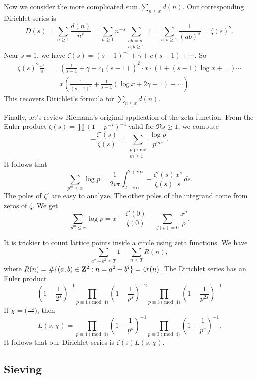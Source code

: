 Now we consider the more complicated sum $\sum_{n\leqslant x} d(n)$. Our 
corresponding Dirichlet series is 
\[
  D(s) = \sum_{n\geqslant 1} \frac{d(n)}{n^s} = \sum_{n\geqslant 1} n^{-s} \sum_{\substack{a b=n \\ a,b\geqslant 1}} 1 = \sum_{a,b\geqslant 1}\frac{1}{(a b)^s} = \zeta(s)^2 .
\]
Near $s=1$, we have $\zeta(s)=(s-1)^{-1} + \gamma + c(s-1) + \cdots$. So 
\begin{align*}
  \zeta(s)^2 \frac{x^s}{s} 
    &= \left(\frac{1}{s-1} + \gamma+ c_1(s-1)\right)^2 \cdot x \cdot \left(1+(s-1)\log x + \ldots\right)\cdots \\
    &= x\left(\frac{1}{(s-1)^2} + \frac{1}{s-1}(\log x+2\gamma-1) + \cdots\right) .
\end{align*}
This recovers Dirichlet's formula for $\sum_{n\leqslant x} d(n)$. 

Finally, let's review Riemann's original application of the zeta function. 
From the Euler product $\zeta(s) = \prod (1-p^{-s})^{-1}$ valid for 
$\Re s\geqslant 1$, we compute 
\[
  -\frac{\zeta'(s)}{\zeta(s)} = \sum_{\substack{p\text{ prime} \\ m\geqslant 1}} \frac{\log p}{p^{m s}} .
\]
It follows that 
\[
  \sum_{p^m\leqslant x} \log p = \frac{1}{2i\pi} \int_{2-i\infty}^{2+i\infty} -\frac{\zeta'(s)}{\zeta(s)} \frac{x^s}{s}\, ds .
\]
The poles of $\zeta'$ are easy to analyze. The other poles of the integrand 
come from zeros of $\zeta$. We get 
\[
  \sum_{p^m\leqslant x} \log p = x-\frac{\zeta'(0)}{\zeta(0)} - \sum_{\zeta(\rho)=0} \frac{x^\rho}{\rho} .
\]

It is trickier to count lattice points inside a circle using zeta functions. 
We have 
\[
  \sum_{a^2+b^2 \leqslant T} 1 = \sum_{n\leqslant T} R(n) ,
\]
where $R(n)=\#\{(a,b)\in \mathbf{Z}^2:n=a^2+b^2\}=4 r(n)$. The Dirichlet series has 
an Euler product 
\[
  \left(1-\frac{1}{2^s}\right)^{-1} \prod_{p\equiv 1\pmod 4} \left(1-\frac{1}{p^s}\right)^{-2} \prod_{p\equiv 3\pmod 4} \left(1-\frac{1}{p^{2 s}}\right)^{-1} 
\]
If $\chi=\bigl(\frac{-4}{\cdot}\bigr)$, then 
\[
  L(s,\chi) = \prod_{p\equiv 1\pmod 4} \left(1-\frac{1}{p^s}\right)^{-1} \prod_{p\equiv 3\pmod 4} \left(1+\frac{1}{p^s}\right)^{-1} .
\]
It follows that our Dirichlet series is $\zeta(s) L(s,\chi)$. 





\subsection{Sieving}

